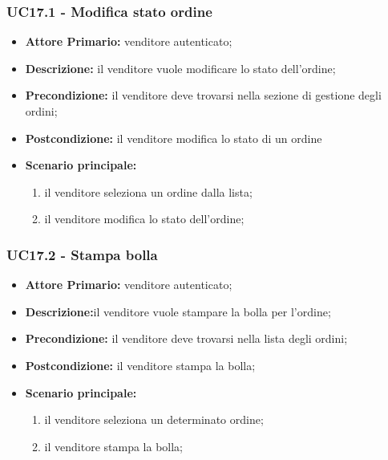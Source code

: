 \subsubsection{UC17.1 - Modifica stato ordine}
\label{UC17.1}
\begin{itemize}
    \item \textbf{Attore Primario:} venditore autenticato;
    \item \textbf{Descrizione:} il venditore vuole modificare lo stato dell'ordine;
    \item \textbf{Precondizione:} il venditore deve trovarsi nella sezione di gestione degli ordini;
    \item \textbf{Postcondizione:} il venditore modifica lo stato di un ordine
    \item \textbf{Scenario principale:}
    \begin{enumerate}
        \item il venditore seleziona un ordine dalla lista;
        \item il venditore modifica lo stato dell'ordine;
    \end{enumerate}
\end{itemize}


\subsubsection{UC17.2 - Stampa bolla}
\label{UC17.2}
\begin{itemize}
    \item \textbf{Attore Primario:} venditore autenticato;
    \item \textbf{Descrizione:}il venditore vuole stampare la bolla per l'ordine;
    \item \textbf{Precondizione:} il venditore deve trovarsi nella lista degli ordini;
    \item \textbf{Postcondizione:} il venditore stampa la bolla;
    \item \textbf{Scenario principale:}
    \begin{enumerate}
        \item il venditore seleziona un determinato ordine;
        \item il venditore stampa la bolla;
    \end{enumerate}
\end{itemize}

